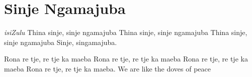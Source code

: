\starttocol
\chapter{Sinje Ngamajuba}
\nexttocol
\hfill{\it isiZulu}
\stoptocol
\starttocol
\startlines
T{\sc hina} sinje, sinje ngamajuba
Thina sinje, sinje ngamajuba 
Thina sinje, sinje ngamajuba
Sinje, singamajuba.

 Rona re tje, re tje ka maeba
 Rona re tje, re tje ka maeba
 Rona re tje, re tje ka maeba
 Rona re tje, re tje ka maeba.
\stoplines
\nexttocol
We are like the doves of peace
\stoptocol
